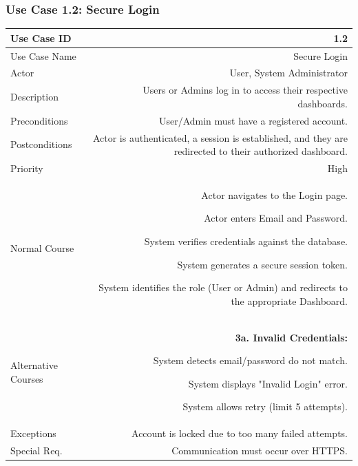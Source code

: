 \documentclass[11pt,a4paper]{report}
\begin{document}
\newpage

\subsubsection{Use Case 1.2: Secure Login}
\begin{tabularx}{\textwidth}{|L|R|}
	\hline
	Use Case ID & 1.2 \\ \hline
	Use Case Name & Secure Login \\ \hline
	Actor & User, System Administrator \\ \hline
	Description & Users or Admins log in to access their respective dashboards. \\ \hline
	Preconditions & User/Admin must have a registered account. \\ \hline
	Postconditions & Actor is authenticated, a session is established, and they are redirected to their authorized dashboard. \\ \hline
	Priority & High \\ \hline
	Normal Course & 
	\begin{normalsteps}
		\item Actor navigates to the Login page.
		\item Actor enters Email and Password.
		\item System verifies credentials against the database.
		\item System generates a secure session token.
		\item System identifies the role (User or Admin) and redirects to the appropriate Dashboard.
	\end{normalsteps} \\ \hline
	Alternative Courses & 
	\textbf{3a. Invalid Credentials:} 
	\begin{altsteps}
		\item System detects email/password do not match.
		\item System displays "Invalid Login" error.
		\item System allows retry (limit 5 attempts).
	\end{altsteps} \\ \hline
	Exceptions & Account is locked due to too many failed attempts. \\ \hline
	Special Req. & Communication must occur over HTTPS. \\ \hline
\end{tabularx}

\newpage
\end{document}
